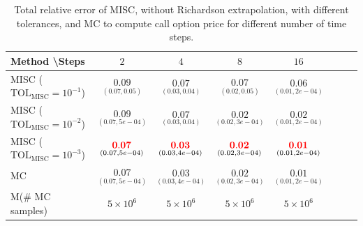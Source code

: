 %	
%	
%
%
%
\begin{table}[h!]
	\centering
	\begin{tabular}{l*{6}{c}r}
		Method \textbackslash  Steps            & $2$ & $4$ & $8$ & $16$  \\
		\hline

		MISC ($\text{TOL}_{\text{MISC}}=10^{-1}$)  & $\underset{(0.07,0.05)}{\mathbf{0.09}}$ & $\underset{(0.03,0.04)}{\mathbf{0.07}}$& $\underset{(0.02,0.05)}{\mathbf{ 0.07}}$ & $\underset{(0.01,2e-04)}{\mathbf{ 0.06}}$   \\

		MISC ($\text{TOL}_{\text{MISC}}=10^{-2}$)  &  $\underset{(0.07,5e-04)}{\mathbf{0.09}}$& $\underset{(0.03,0.04)}{\mathbf{0.07}}$& $\underset{(0.02,3e-04)}{\mathbf{ 0.02}}$ & $\underset{(0.01,2e-04)}{\mathbf{ 0.02}}$  \\
		MISC ($\text{TOL}_{\text{MISC}}=10^{-3}$)  &  $\underset{(0.07,5e-04)}{\mathbf{{\color{red}0.07}}}$& $\underset{(0.03,4e-04)}{\mathbf{{\color{red}0.03}}}$& $\underset{(0.02,3e-04)}{\mathbf{{\color{red}0.02}}}$  & $\underset{(0.01,2e-04)}{\mathbf{ {\color{red}0.01}}}$  \\

		\hline
		MC    & $\underset{(0.07,5e-04)}{\mathbf{0.07}}$  & $\underset{(0.03,4e-04)}{\mathbf{0.03}}$  & $\underset{(0.02,3e-04)}{\mathbf{0.02}}$ & $\underset{(0.01,2e-04)}{\mathbf{0.01}}$  \\		
			M(\# MC samples)   & $5 \times 10^6$  & $5 \times 10^6$  & $5 \times 10^6$ & $5 \times 10^6$  \\		
		\hline
	\end{tabular}
	\caption{Total relative error of MISC, without Richardson extrapolation, with  different tolerances,  and MC to compute call option price  for different number of time steps.}
	\label{Total error of MISC and MC to compute Call option price of the different tolerances for different number of time steps. Case set 5, without Richardson extrapolation. The numbers between parentheses are the corresponding absolute errors.}
\end{table}

